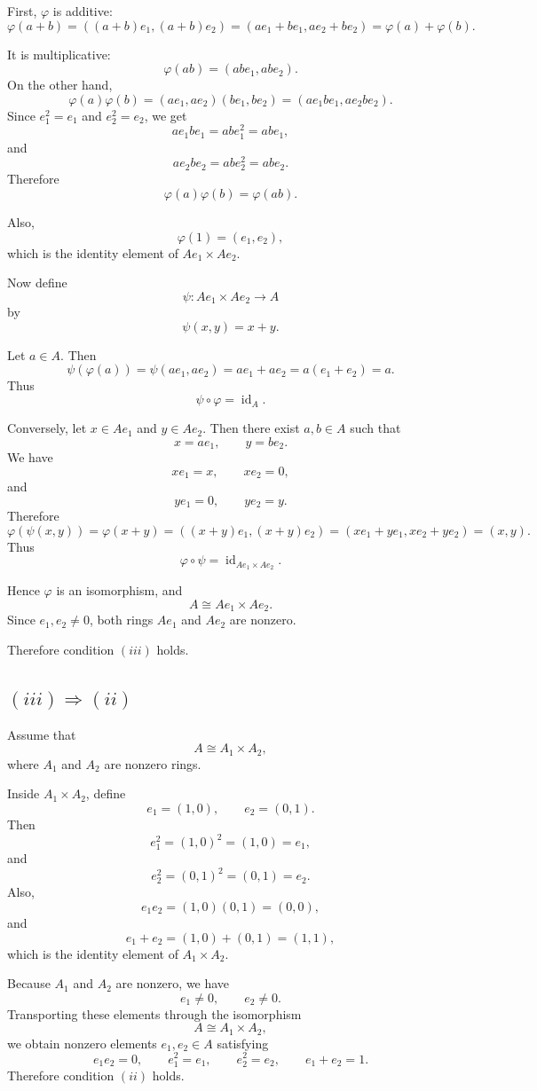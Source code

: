 	First, \(\varphi\) is additive:
	\[
	\varphi(a+b)=((a+b)e_1,(a+b)e_2)
	=(ae_1+be_1,ae_2+be_2)
	=\varphi(a)+\varphi(b).
	\]
	
	It is multiplicative:
	\[
	\varphi(ab)=(abe_1,abe_2).
	\]
	On the other hand,
	\[
	\varphi(a)\varphi(b)
	=
	(ae_1,ae_2)(be_1,be_2)
	=
	(ae_1be_1,ae_2be_2).
	\]
	Since \(e_1^2=e_1\) and \(e_2^2=e_2\), we get
	\[
	ae_1be_1=ab e_1^2=ab e_1,
	\]
	and
	\[
	ae_2be_2=ab e_2^2=ab e_2.
	\]
	Therefore
	\[
	\varphi(a)\varphi(b)=\varphi(ab).
	\]
	
	Also,
	\[
	\varphi(1)=(e_1,e_2),
	\]
	which is the identity element of \(Ae_1\times Ae_2\).
	
	Now define
	\[
	\psi:Ae_1\times Ae_2\longrightarrow A
	\]
	by
	\[
	\psi(x,y)=x+y.
	\]
	
	Let \(a\in A\). Then
	\[
	\psi(\varphi(a))
	=
	\psi(ae_1,ae_2)
	=
	ae_1+ae_2
	=
	a(e_1+e_2)
	=
	a.
	\]
	Thus
	\[
	\psi\circ\varphi=\operatorname{id}_A.
	\]
	
	Conversely, let \(x\in Ae_1\) and \(y\in Ae_2\). Then there exist \(a,b\in A\)
	such that
	\[
	x=ae_1,
	\qquad
	y=be_2.
	\]
	We have
	\[
	xe_1=x,
	\qquad
	xe_2=0,
	\]
	and
	\[
	ye_1=0,
	\qquad
	ye_2=y.
	\]
	Therefore
	\[
	\varphi(\psi(x,y))
	=
	\varphi(x+y)
	=
	((x+y)e_1,(x+y)e_2)
	=
	(xe_1+ye_1,xe_2+ye_2)
	=
	(x,y).
	\]
	Thus
	\[
	\varphi\circ\psi=\operatorname{id}_{Ae_1\times Ae_2}.
	\]
	
	Hence \(\varphi\) is an isomorphism, and
	\[
	A\cong Ae_1\times Ae_2.
	\]
	Since \(e_1,e_2\neq 0\), both rings \(Ae_1\) and \(Ae_2\) are nonzero.
	
	Therefore condition \((iii)\) holds.
	
	\subsection*{\((iii)\Rightarrow(ii)\)}
	
	Assume that
	\[
	A\cong A_1\times A_2,
	\]
	where \(A_1\) and \(A_2\) are nonzero rings.
	
	Inside \(A_1\times A_2\), define
	\[
	e_1=(1,0),
	\qquad
	e_2=(0,1).
	\]
	Then
	\[
	e_1^2=(1,0)^2=(1,0)=e_1,
	\]
	and
	\[
	e_2^2=(0,1)^2=(0,1)=e_2.
	\]
	Also,
	\[
	e_1e_2=(1,0)(0,1)=(0,0),
	\]
	and
	\[
	e_1+e_2=(1,0)+(0,1)=(1,1),
	\]
	which is the identity element of \(A_1\times A_2\).
	
	Because \(A_1\) and \(A_2\) are nonzero, we have
	\[
	e_1\neq 0,
	\qquad
	e_2\neq 0.
	\]
	Transporting these elements through the isomorphism
	\[
	A\cong A_1\times A_2,
	\]
	we obtain nonzero elements \(e_1,e_2\in A\) satisfying
	\[
	e_1e_2=0,
	\qquad
	e_1^2=e_1,
	\qquad
	e_2^2=e_2,
	\qquad
	e_1+e_2=1.
	\]
	Therefore condition \((ii)\) holds.
	
